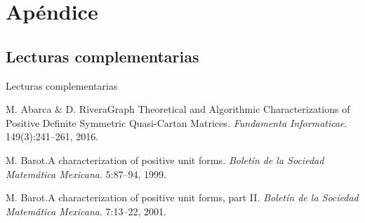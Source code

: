 \documentclass[spanish]{beamer}
\begin{document}
\appendix

\section*{Apéndice}

\subsection*{Lecturas complementarias}
\begin{frame}[allowframebreaks]{Lecturas complementarias}

\beamertemplatebookbibitems
\begin{thebibliography}{1}

M. Abarca \& D. Rivera\newblock Graph Theoretical and 
Algorithmic Characterizations of Positive Definite Symmetric Quasi-Cartan 
Matrices\emph{.}
\newblock\emph{Fundamenta Informaticae}. 149(3):241--261, 2016.

M. Barot.\newblock A characterization of positive unit 
forms\emph{.}
\newblock\emph{Boletín de la Sociedad Matemática Mexicana}. 5:87--94, 1999.

M. Barot.\newblock A characterization of positive unit 
forms, part II\emph{.}
\newblock\emph{Boletín de la Sociedad Matemática Mexicana}. 7:13--22, 2001.

\end{thebibliography}
\end{frame}
\end{document}
